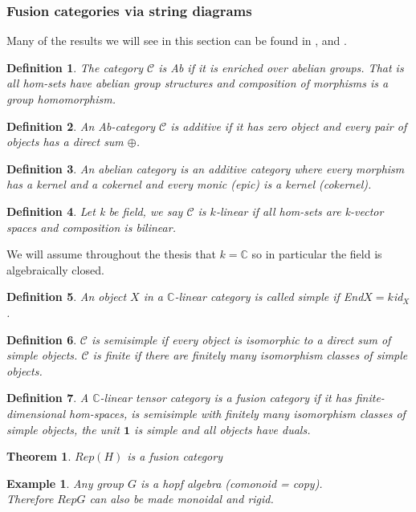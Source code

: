 \documentclass{article}
\newtheorem{definition}{Definition}
\newtheorem{example}{Example}
\newtheorem{theorem}{Theorem}
\begin{document}
\subsubsection{Fusion categories via string diagrams}
Many of the results we will see in this section can be found in \cite{Mueger08}, \cite{Bartlett15} and \cite{Freyd66}.
\begin{definition}
The category $\mathcal{C}$ is Ab if it is enriched over abelian groups. That is all hom-sets have abelian group structures and composition of morphisms is a group homomorphism. 
\end{definition}
\begin{definition}
An Ab-category $\mathcal{C}$ is additive if it has zero object and every pair of objects has a direct sum $\oplus$.
\end{definition}
\begin{definition}
An abelian category is an additive category where every morphism has a kernel and a cokernel and every monic (epic) is a kernel (cokernel).
\end{definition}
\begin{definition}
Let k be field, we say $\mathcal{C}$ is $k$-linear if all hom-sets are k-vector spaces and composition is bilinear.
\end{definition}
We will assume throughout the thesis that $k=\mathbb{C}$ so in particular the field is algebraically closed. 
\begin{definition}
An object $X$ in a $\mathbb{C}$-linear category is called simple if End$X=k$id$_X$.
\end{definition}
\begin{definition}
$\mathcal{C}$ is semisimple if every object is isomorphic to a direct sum of simple objects. $\mathcal{C}$ is finite if there are finitely many isomorphism classes of simple objects.
\end{definition}
\begin{definition}
A $\mathbb{C}$-linear tensor category is a fusion category if it has finite-dimensional hom-spaces, is semisimple with finitely many isomorphism classes of simple objects, the unit $\mathbf{1}$ is simple  and all objects have duals.
\end{definition}

\begin{theorem}
$Rep(H)$ is a fusion category
\end{theorem}

\begin{example}
Any group $G$ is a hopf algebra (comonoid = copy).\\
Therefore $RepG$ can also be made monoidal and rigid.
\end{example}
\end{document}
